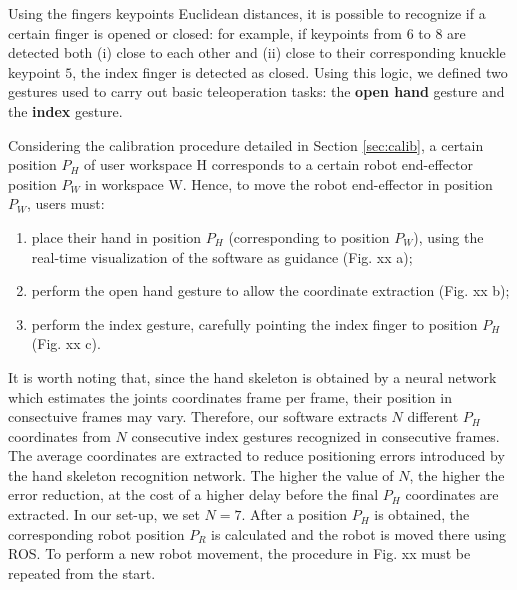 \documentclass[letterpaper, 10 pt, conference]{ieeeconf}  %
\begin{document}
Using the fingers keypoints Euclidean distances, it is possible to recognize if a certain finger is opened or closed: for example, if keypoints from $6$ to $8$ are detected both (i) close to each other and (ii) close to their corresponding knuckle keypoint $5$, the index finger is detected as closed. 
Using this logic, we defined two gestures used to carry out basic teleoperation tasks: the \textbf{open hand} gesture and the \textbf{index} gesture.

Considering the calibration procedure detailed in Section \ref{sec:calib}, a certain position $P_H$ of user workspace H corresponds to a certain robot end-effector position $P_W$ in workspace W. Hence, to move the robot end-effector in position $P_W$, users must: %
\begin{enumerate}
\item place their hand in position $P_H$ (corresponding to position $P_W$), using the real-time visualization of the software as guidance (Fig. xx a);
\item perform the open hand gesture to allow the coordinate extraction (Fig. xx b);
\item perform the index gesture, carefully pointing the index finger to position $P_H$ (Fig. xx c).
\end{enumerate}

It is worth noting that, since the hand skeleton is obtained by a neural network which estimates the joints coordinates frame per frame, their position in consectuive frames may vary. Therefore, our software extracts $N$ different $P_H$ coordinates from $N$ consecutive index gestures recognized in consecutive frames. The average coordinates are extracted to reduce positioning errors introduced by the hand skeleton recognition network. The higher the value of $N$, the higher the error reduction, at the cost of a higher delay before the final $P_H$ coordinates are extracted. In our set-up, we set $N = 7$.
After a position $P_H$ is obtained, the corresponding robot position $P_R$ is calculated and the robot is moved there using ROS.
To perform a new robot movement, the procedure in Fig. xx must be repeated from the start.
\end{document}
